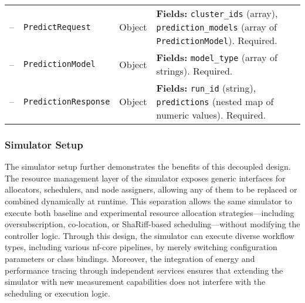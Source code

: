 \begin{table}[H]
{\begin{tabular}{
            p{0.8cm}
            p{5.3cm}
            >{\centering\arraybackslash}p{2cm}
            p{9cm}
            }
            --          & \texttt{PredictRequest}         & Object          &
            \textbf{Fields:} \texttt{cluster\_ids} (array), \texttt{prediction\_models} (array of \texttt{PredictionModel}). Required. \\

            --          & \texttt{PredictionModel}        & Object          &
            \textbf{Fields:} \texttt{model\_type} (array of strings). Required.                                                        \\

            --          & \texttt{PredictionResponse}     & Object          &
            \textbf{Fields:} \texttt{run\_id} (string), \texttt{predictions} (nested map of numeric values). Required.                 \\


            \bottomrule
        \end{tabular}
    }
\end{table}

\subsubsection{Simulator Setup}
\label{sec:simulator_setup}
The simulator setup further demonstrates the benefits of this decoupled design. The resource management layer of the simulator exposes generic interfaces for allocators, schedulers, and node assigners, allowing any of them to be replaced or combined dynamically at runtime. This separation allows the same simulator to execute both baseline and experimental resource allocation strategies—including oversubscription, co-location, or ShaRiff-based scheduling—without modifying the controller logic. Through this design, the simulator can execute diverse workflow types, including various nf-core pipelines, by merely switching configuration parameters or class bindings. Moreover, the integration of energy and performance tracing through independent services ensures that extending the simulator with new measurement capabilities does not interfere with the scheduling or execution logic.

